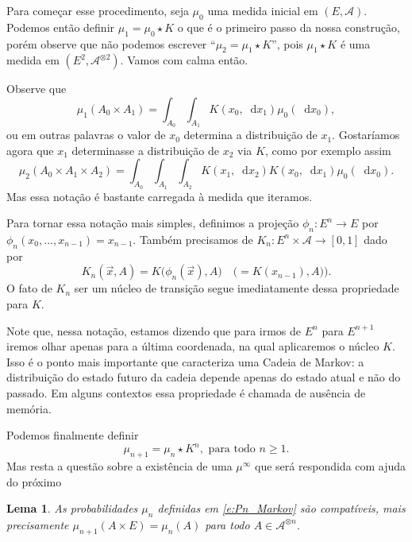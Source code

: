 \documentclass[reqno, draft]{book}
\newcommand*\1{\mathds{1}}
\newtheorem{lemma}[theorem]{Lema}
\renewcommand*\d{\mathop{}\!\mathrm{d}}
\begin{document}
Para começar esse procedimento, seja $\mu_0$ uma medida inicial em $(E, \mathcal{A})$.
Podemos então definir $\mu_1 = \mu_0 \star K$ o que é o primeiro passo da nossa construção, porém observe que não podemos escrever ``$\mu_2 = \mu_1 \star K$'', pois $\mu_1 \star K$ é uma medida em $(E^2, \mathcal{A}^{\otimes 2})$.
Vamos com calma então.

Observe que
\begin{equation}
  \mu_1(A_0 \times A_1) = \int_{A_0} \int_{A_1} K(x_0, \d x_1) \mu_0(\d x_0),
\end{equation}
ou em outras palavras o valor de $x_0$ determina a distribuição de $x_1$.
Gostaríamos agora que $x_1$ determinasse a distribuição de $x_2$ via $K$, como por exemplo assim
\begin{equation}
  \mu_2(A_0 \times A_1 \times A_2) = \int_{A_0} \int_{A_1} \int_{A_2} K(x_1, \d x_2) K(x_0, \d x_1) \mu_0 (\d x_0).
\end{equation}
Mas essa notação é bastante carregada à medida que iteramos.

Para tornar essa notação mais simples, definimos a projeção $\phi_n:E^n \to E$ por $\phi_n(x_0, \dots, x_{n-1}) = x_{n-1}$.
Também precisamos de $K_n: E^n \times \mathcal{A} \to [0,1]$ dado por
\begin{equation}
  K_n(\vec{x},A) = K\big(\phi_n(\vec{x}), A\big) \quad \big(= K(x_{n-1}),A) \big).
\end{equation}
O fato de $K_n$ ser um núcleo de transição segue imediatamente dessa propriedade para $K$.

Note que, nessa notação, estamos dizendo que para irmos de $E^n$ para $E^{n+1}$ iremos olhar apenas para a última coordenada, na qual aplicaremos o núcleo $K$.
Isso é o ponto mais importante que caracteriza uma Cadeia de Markov: a distribuição do estado futuro da cadeia depende apenas do estado atual e não do passado.
Em alguns contextos essa propriedade é chamada de ausência de memória.

Podemos finalmente definir
\begin{equation}
  \label{e:Pn_Markov}
  \mu_{n+1} = \mu_n \star K^n, \text{ para todo $n \geq 1$}.
\end{equation}
Mas resta a questão sobre a existência de uma $\mu^\infty$ que será respondida com ajuda do próximo

\begin{lemma}
  As probabilidades $\mu_n$ definidas em \eqref{e:Pn_Markov} são compatíveis, mais precisamente $\mu_{n+1}(A \times E) = \mu_n(A)$ para todo $A \in \mathcal{A}^{\otimes n}$.
\end{lemma}
\end{document}
